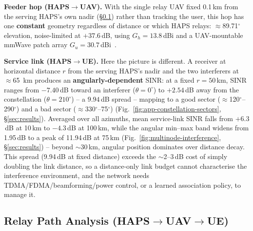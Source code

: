 \documentclass[]{ieeeaccess}
\begin{document}
\textbf{Feeder hop (HAPS$\to$UAV).} With the single relay UAV fixed 0.1\,km from the serving HAPS's own nadir (\S\ref{sec:relay-path-analysis}) rather than tracking the user, this hop has one \textbf{constant} geometry regardless of distance or which HAPS relays: $\approx$89.71$^\circ$ elevation, noise-limited at $+37.6$\,dB, using $G_h=13.8$\,dBi and a UAV-mountable mmWave patch array $G_u=30.7$\,dBi~\cite{anim2021uav}.

\textbf{Service link (HAPS$\to$UE).} Here the picture is different. A receiver at horizontal distance $r$ from the serving HAPS's nadir and the two interferers at $\approx$65~km produces an \textbf{angularly-dependent} SINR: at a fixed $r=50$\,km, SINR ranges from $-7.40$\,dB toward an interferer ($\theta=0^\circ$) to $+2.54$\,dB away from the constellation ($\theta=210^\circ$) -- a $9.94$\,dB spread -- mapping to a good sector ($\approx$120$^\circ$--290$^\circ$) and a bad sector ($\approx$330$^\circ$--75$^\circ$) (Fig.~\ref{fig:app-constellation-sectors}, \S\ref{sec:results}). Averaged over all azimuths, mean service-link SINR falls from $+6.3$\,dB at 10\,km to $-4.3$\,dB at 100\,km, while the angular min--max band widens from 1.95\,dB to a peak of 11.94\,dB at 75\,km (Fig.~\ref{fig:multinode-interference}, \S\ref{sec:results}) -- beyond $\sim$30\,km, angular position dominates over distance decay. This spread (9.94\,dB at fixed distance) exceeds the $\sim$2--3\,dB cost of simply doubling the link distance, so a distance-only link budget cannot characterise the interference environment, and the network needs TDMA/FDMA/beamforming/power control, or a learned association policy, to manage it.

\subsection{Relay Path Analysis (HAPS$\to$UAV$\to$UE)}
\label{sec:relay-path-analysis}
\end{document}

